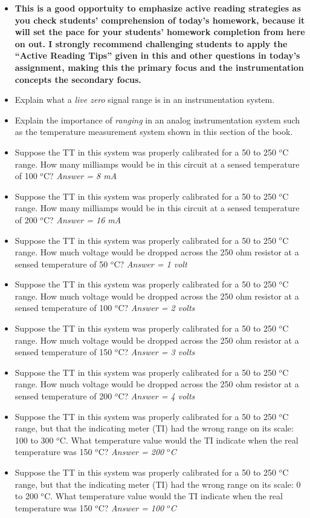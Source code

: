 \begin{itemize}
\item{} {\bf This is a good opportuity to emphasize active reading strategies as you check students' comprehension of today's homework, because it will set the pace for your students' homework completion from here on out.  I strongly recommend challenging students to apply the ``Active Reading Tips'' given in this and other questions in today's assignment, making this the primary focus and the instrumentation concepts the secondary focus.}
\item{} Explain what a {\it live zero} signal range is in an instrumentation system.
\item{} Explain the importance of {\it ranging} in an analog instrumentation system such as the temperature measurement system shown in this section of the book.
\item{} Suppose the TT in this system was properly calibrated for a 50 to 250 $^{o}$C range.  How many milliamps would be in this circuit at a sensed temperature of 100 $^{o}$C?  {\it Answer = 8 mA} 
\item{} Suppose the TT in this system was properly calibrated for a 50 to 250 $^{o}$C range.  How many milliamps would be in this circuit at a sensed temperature of 200 $^{o}$C?  {\it Answer = 16 mA} 
\item{} Suppose the TT in this system was properly calibrated for a 50 to 250 $^{o}$C range.  How much voltage would be dropped across the 250 ohm resistor at a sensed temperature of 50 $^{o}$C?  {\it Answer = 1 volt}
\item{} Suppose the TT in this system was properly calibrated for a 50 to 250 $^{o}$C range.  How much voltage would be dropped across the 250 ohm resistor at a sensed temperature of 100 $^{o}$C?  {\it Answer = 2 volts}
\item{} Suppose the TT in this system was properly calibrated for a 50 to 250 $^{o}$C range.  How much voltage would be dropped across the 250 ohm resistor at a sensed temperature of 150 $^{o}$C?  {\it Answer = 3 volts}
\item{} Suppose the TT in this system was properly calibrated for a 50 to 250 $^{o}$C range.  How much voltage would be dropped across the 250 ohm resistor at a sensed temperature of 200 $^{o}$C?  {\it Answer = 4 volts}
\item{} Suppose the TT in this system was properly calibrated for a 50 to 250 $^{o}$C range, but that the indicating meter (TI) had the wrong range on its scale: 100 to 300 $^{o}$C.  What temperature value would the TI indicate when the real temperature was 150 $^{o}$C?  {\it Answer = 200 $^{o}$C}
\item{} Suppose the TT in this system was properly calibrated for a 50 to 250 $^{o}$C range, but that the indicating meter (TI) had the wrong range on its scale: 0 to 200 $^{o}$C.  What temperature value would the TI indicate when the real temperature was 150 $^{o}$C?  {\it Answer = 100 $^{o}$C}
\end{itemize}





